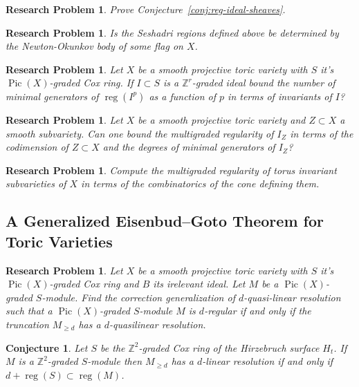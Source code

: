 \documentclass[11pt,reqno]{amsart}
\newtheorem{problem}[lemma]{Research Problem}
\newtheorem{conjecture}[lemma]{Conjecture}
\theoremstyle{remark}
\newcommand{\reg}{\operatorname{reg}}
\newcommand{\Pic}{\operatorname{Pic}}
\newcommand{\ZZ}{\mathbb{Z}}
\begin{document}
 \begin{problem}
 	Prove Conjecture~\ref{conj:reg-ideal-sheaves}. 
 \end{problem}
 
 \begin{problem}
 	Is the Seshadri regions defined above be determined by the Newton-Okunkov body of some flag on $X$. 
 \end{problem}
 
 \begin{problem}
 	Let $X$ be a smooth projective toric variety with $S$ it's $\Pic(X)$-graded Cox ring. If $I\subset S$ is a $\ZZ^r$-graded ideal bound the number of minimal generators of $\reg(I^p)$ as a function of $p$ in terms of invariants of $I$?
\end{problem}
 
 \begin{problem}
 	Let $X$ be a smooth projective toric variety and $Z\subset X$ a smooth subvariety. Can one bound the multigraded regularity of $I_{Z}$ in terms of the codimension of $Z\subset X$ and the degrees of minimal generators of $I_{Z}$?
\end{problem}

\begin{problem}
	Compute the multigraded regularity of torus invariant subvarieties of $X$ in terms of the combinatorics of the cone defining them.
\end{problem}

 \subsection{A Generalized Eisenbud--Goto Theorem for Toric Varieties}
 
 \begin{problem}
 	Let $X$ be a smooth projective toric variety with $S$ it's $\Pic(X)$-graded Cox ring and $B$ its irelevant ideal. Let $M$ be a $\Pic(X)$-graded $S$-module.  Find the correction generalization of $d$-quasi-linear resolution such that a $\Pic(X)$-graded $S$-module  $M$ is $d$-regular if and only if the truncation $M_{\geq d}$ has a $d$-quasilinear resolution. 
\end{problem}
 
 
\begin{conjecture}\label{conj:eg-hirzebruch}
	Let $S$ be the $\ZZ^2$-graded Cox ring of the Hirzebruch surface $H_{t}$. If $M$ is a $\ZZ^2$-graded $S$-module then $M_{\geq d}$ has a $d$-linear resolution if and only if $d+\reg(S) \subset \reg(M)$. 
\end{conjecture}
\end{document}
